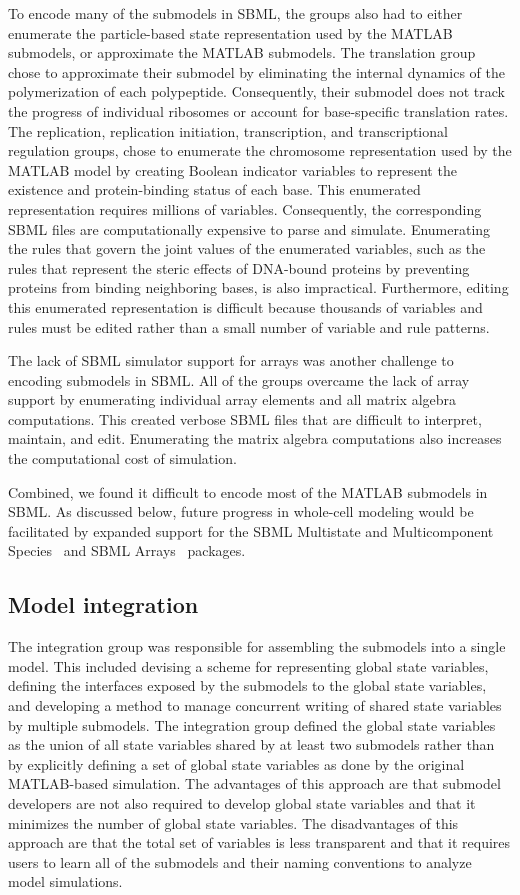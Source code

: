 \documentclass[journal,transmag]{IEEEtran}
\begin{document}
To encode many of the submodels in SBML, the groups also had to either enumerate the particle-based state representation used by the MATLAB submodels, or approximate the MATLAB submodels. The translation group chose to approximate their submodel by eliminating the internal dynamics of the polymerization of each polypeptide. Consequently, their submodel does not track the progress of individual ribosomes or account for base-specific translation rates. The replication, replication initiation, transcription, and transcriptional regulation groups, chose to enumerate the chromosome representation used by the MATLAB model by creating Boolean indicator variables to represent the existence and protein-binding status of each base. This enumerated representation requires millions of variables. Consequently, the corresponding SBML files are computationally expensive to parse and simulate. Enumerating the rules that govern the joint values of the enumerated variables, such as the rules that represent the steric effects of DNA-bound proteins by preventing proteins from binding neighboring bases, is also impractical. Furthermore, editing this enumerated representation is difficult because thousands of variables and rules must be edited rather than a small number of variable and rule patterns.

The lack of SBML simulator support for arrays was another challenge to encoding submodels in SBML. All of the groups overcame the lack of array support by enumerating individual array elements and all matrix algebra computations. This created verbose SBML files that are difficult to interpret, maintain, and edit. Enumerating the matrix algebra computations also increases the computational cost of simulation.

Combined, we found it difficult to encode most of the MATLAB submodels in SBML. As discussed below, future progress in whole-cell modeling would be facilitated by expanded support for the SBML Multistate and Multicomponent Species~\cite{SBMLMulti} and SBML Arrays~\cite{SBMLArrays} packages.

\subsection{Model integration}
The integration group was responsible for assembling the submodels into a single model. This included devising a scheme for representing global state variables, defining the interfaces exposed by the submodels to the global state variables, and developing a method to manage concurrent writing of shared state variables by multiple submodels. The integration group defined the global state variables as the union of all state variables shared by at least two submodels rather than by explicitly defining a set of global state variables as done by the original MATLAB-based simulation. The advantages of this approach are that submodel developers are not also required to develop global state variables and that it minimizes the number of global state variables. The disadvantages of this approach are that the total set of variables is less transparent and that it requires users to learn all of the submodels and their naming conventions to analyze model simulations.
\end{document}

